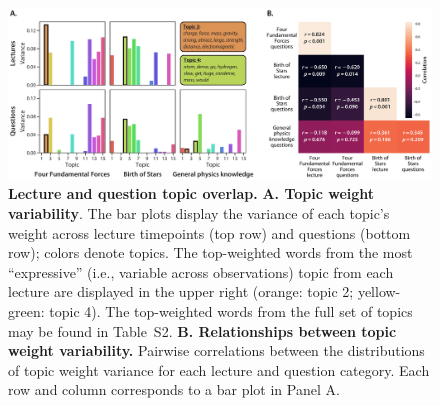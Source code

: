 \documentclass[10pt]{article}
\newcommand{\topics}{S2}
\begin{document}
\begin{figure}[tp]
    \centering
    \includegraphics[width=\textwidth]{figs/active-topics}

\caption{\textbf{Lecture and question topic overlap.} \textbf{A. Topic weight
variability}. The bar plots display the variance of each topic's weight across
lecture timepoints (top row) and questions (bottom row); colors denote topics.
The top-weighted words from the most ``expressive'' (i.e., variable across
observations) topic from each lecture are displayed in the upper right (orange:
topic 2; yellow-green: topic 4). The top-weighted words from the full set of
topics may be found in Table~\topics. \textbf{B. Relationships between topic
weight variability.} Pairwise correlations between the distributions of topic
weight variance for each lecture and question category. Each row and column
corresponds to a bar plot in Panel A.}

    \label{fig:topics}
\end{figure}
\end{document}
